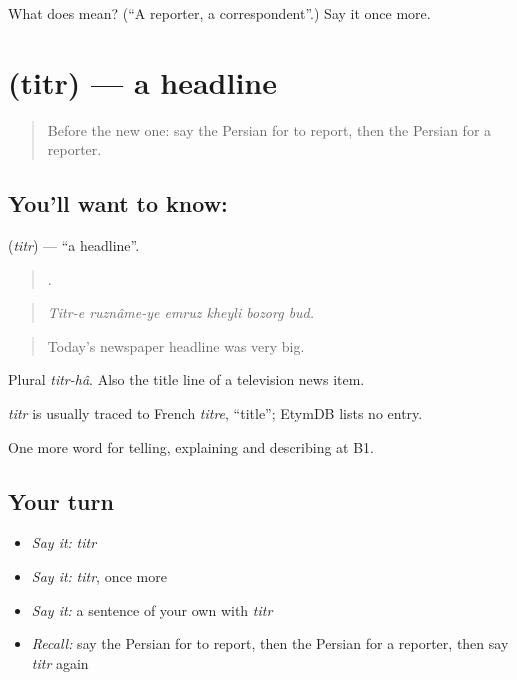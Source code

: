\begin{tcolorbox}[breakable,colback=teal!4,colframe=teal!35!black,title={Before you move on}]
What does  mean? (\textquotedblleft{}A reporter, a correspondent\textquotedblright{}.) Say it once more.
\end{tcolorbox}
\section[\texorpdfstring{\fa{تیتر} (titr)}{تیتر (titr)}]{ (titr) — a headline}

\label{lesson:FA-C308-titr}



\begin{quote}
Before the new one: say the Persian for to report, then the Persian for a reporter.
\end{quote}

\subsection*{You'll want to know: }
\textbf{} (\emph{titr}) — \textquotedblleft{}a headline\textquotedblright{}.

\begin{quote}
     .
\end{quote}

\begin{quote}
\emph{Titr-e ruznâme-ye emruz kheyli bozorg bud.}
\end{quote}

\begin{quote}
Today's newspaper headline was very big.
\end{quote}

Plural \emph{titr-hâ}. Also the title line of a television news item.

\begin{cousinweb}
\emph{titr} is usually traced to French \emph{titre}, \textquotedblleft{}title\textquotedblright{}; EtymDB lists no entry.
\end{cousinweb}

\begin{grammarlens}[title={What you've built}]
One more word for telling, explaining and describing at B1.
\end{grammarlens}

\subsection*{Your turn}
\begin{itemize}
\raggedright
  \item \emph{Say it:} \emph{titr}
  \item \emph{Say it:} \emph{titr}, once more
  \item \emph{Say it:} a sentence of your own with \emph{titr}
  \item \emph{Recall:} say the Persian for to report, then the Persian for a reporter, then say \emph{titr} again
\end{itemize}

